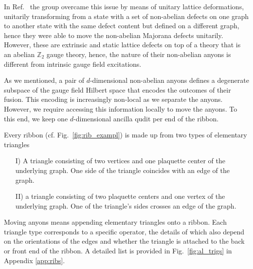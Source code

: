 \documentclass[a4paper,twocolumn,11pt]{quantumarticle}
\begin{document}
In Ref.~\cite{andersen2022observation} the group overcame this issue by means of unitary lattice deformations, unitarily transforming from a state with a set of non-abelian defects on one graph to another state with the same defect content but defined on a different graph, hence they were able to move the non-abelian Majorana defects unitarily. However, these are extrinsic and static lattice defects on top of a theory that is an abelian $\mathbb Z_2$ gauge theory, hence, the nature of their non-abelian anyons is different from intrinsic gauge field excitations.

As we mentioned, a pair of $d$-dimensional non-abelian anyons defines a degenerate subspace of the gauge field Hilbert space that encodes the outcomes of their fusion. This encoding is increasingly non-local as we separate the anyons. However, we require accessing this information locally to move the anyons. To this end, we keep one $d$-dimensional ancilla qudit per end of the ribbon.

Every ribbon (cf. Fig.~\ref{fig:rib_exampl}) is made up from two types of elementary triangles
\begin{itemize}
    \item[I)] A triangle consisting of two vertices and one plaquette center of the underlying graph. One side of the triangle coincides with an edge of the graph.
        \item[II)] a triangle consisting of two plaquette centers and one vertex of the underlying graph. One of the triangle's sides crosses an edge of the graph.
\end{itemize}
Moving anyons means appending elementary triangles onto a ribbon. Each triangle type corresponds to a specific operator, the details of which also depend on the orientations of the edges and whether the triangle is attached to the back or front end of the ribbon. A detailed list is provided in Fig.~\ref{fig:al_trigs} in Appendix \ref{app:ribs}.
\end{document}
